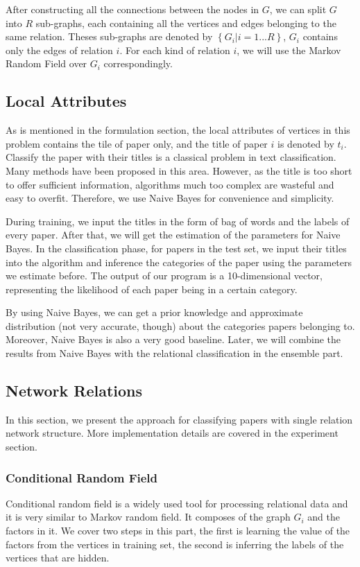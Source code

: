 \documentclass{sig-alternate}
\begin{document}
After constructing all the connections between the nodes in $G$, we can split $G$ into $R$ sub-graphs, each containing all the vertices and edges belonging to the same relation. Theses sub-graphs are denoted by $\left \{ G_{i}|i=1...R \right \}$, $G_{i}$ contains only the edges of relation $i$. For each kind of relation $i$, we will use the Markov Random Field over $G_{i}$ correspondingly.

\subsection{Local Attributes}
As is mentioned in the formulation section, the local attributes of vertices in this problem contains the tile of paper only, and the title of paper $i$ is denoted by $t_{i}$. Classify the paper with their titles is a classical problem in text classification. Many methods have been proposed in this area. However, as the title is too short to offer sufficient information, algorithms much too complex are wasteful and easy to overfit. Therefore, we use Naive Bayes for convenience and simplicity.

During training, we input the titles in the form of bag of words and the labels of every paper. After that, we will get the estimation of the parameters for Naive Bayes. In the classification phase, for papers in the test set, we input their titles into the algorithm and inference the categories of the paper using the parameters we estimate before. The output of our program is a 10-dimensional vector, representing the likelihood of each paper being in a certain category. 

By using Naive Bayes, we can get a prior knowledge and approximate distribution (not very accurate, though) about the categories papers belonging to. Moreover, Naive Bayes is also a very good baseline. Later, we will combine the results from Naive Bayes with the relational classification in the ensemble part.

\subsection{Network Relations}
In this section, we present the approach for classifying papers with single relation network structure. More implementation details are covered in the experiment section.

\subsubsection{Conditional Random Field}
Conditional random field is a widely used tool for processing relational data and it is very similar to Markov random field. It composes of the graph $G_{i}$ and the factors in it. We cover two steps in this part, the first is learning the value of the factors from the vertices in training set, the second is inferring the labels of the vertices that are hidden.
\end{document}
